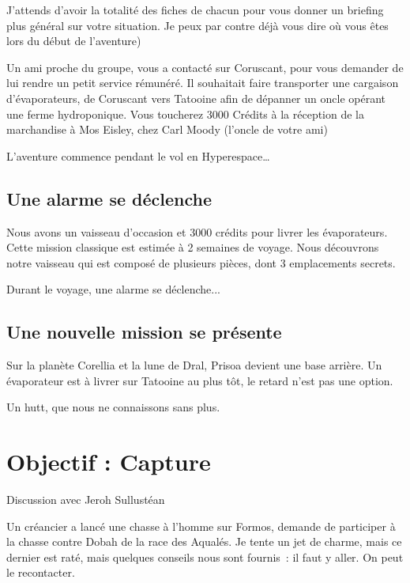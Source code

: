 \documentclass[a4paper,9pt,twoside,twocolumn,openany]{book}
\begin{document}
\begin{quotebox}
J’attends d’avoir la totalité des fiches de chacun pour vous donner un briefing plus général sur votre situation. Je peux par contre déjà vous dire où vous êtes lors du début de l’aventure)
\end{quotebox}

Un ami proche du groupe, vous a contacté sur Coruscant, pour vous demander de lui rendre un petit service rémunéré. Il souhaitait faire transporter une cargaison d’évaporateurs, de Coruscant vers Tatooine afin de dépanner un oncle opérant une ferme hydroponique. Vous toucherez 3000 Crédits à la réception de la marchandise à Mos Eisley, chez Carl Moody (l’oncle de votre ami)

L’aventure commence pendant le vol en Hyperespace…

\section{Une alarme se déclenche}
\subtitle{ 1\ier{} mai 2014}

Nous avons un vaisseau d’occasion et 3000 crédits pour livrer les évaporateurs. Cette mission classique est estimée à 2 semaines de voyage. Nous découvrons notre vaisseau qui est composé de plusieurs pièces, dont 3 emplacements secrets.

Durant le voyage, une alarme se déclenche...

\section{Une nouvelle mission se présente}
\subtitle{12 octobre 2014}

Sur la planète Corellia et la lune de Dral, Prisoa devient une base arrière. Un évaporateur est à livrer sur Tatooine au plus tôt, le retard n'est pas une option.

Un hutt, que nous ne connaissons sans plus.

\chapter{Objectif : Capture}

\begin{commentbox}{Discussion avec Jeroh Sullustéan}

Un créancier a lancé une chasse à l'homme sur Formos, demande de participer à la chasse contre Dobah de la race des Aqualés. Je tente un jet de charme, mais ce dernier est raté, mais quelques conseils nous sont fournis\ : il faut y aller. On peut le recontacter.
\end{commentbox}
\end{document}
